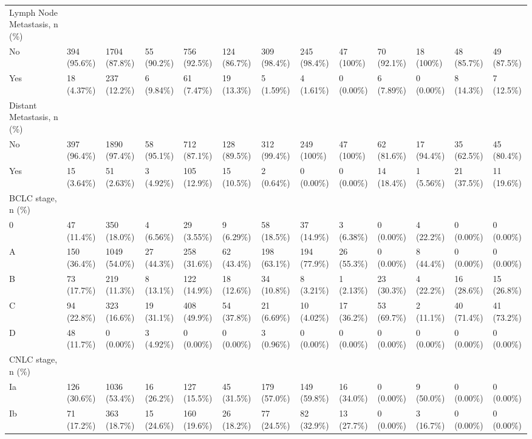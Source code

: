 \begin{landscape}
\begin{center}
\begin{longtable}{p{5.2cm}p{3.0cm}}
Lymph Node Metastasis, n (\%) &  &  &  &  &  &  &  &  &  &  &  &  \\
No & 394 (95.6\%) & 1704 (87.8\%) & 55 (90.2\%) & 756 (92.5\%) & 124 (86.7\%) & 309 (98.4\%) & 245 (98.4\%) & 47 (100\%) & 70 (92.1\%) & 18 (100\%) & 48 (85.7\%) & 49 (87.5\%) \\
Yes & 18 (4.37\%) & 237 (12.2\%) & 6 (9.84\%) & 61 (7.47\%) & 19 (13.3\%) & 5 (1.59\%) & 4 (1.61\%) & 0 (0.00\%) & 6 (7.89\%) & 0 (0.00\%) & 8 (14.3\%) & 7 (12.5\%) \\
Distant Metastasis, n (\%) &  &  &  &  &  &  &  &  &  &  &  &  \\
No & 397 (96.4\%) & 1890 (97.4\%) & 58 (95.1\%) & 712 (87.1\%) & 128 (89.5\%) & 312 (99.4\%) & 249 (100\%) & 47 (100\%) & 62 (81.6\%) & 17 (94.4\%) & 35 (62.5\%) & 45 (80.4\%) \\
Yes & 15 (3.64\%) & 51 (2.63\%) & 3 (4.92\%) & 105 (12.9\%) & 15 (10.5\%) & 2 (0.64\%) & 0 (0.00\%) & 0 (0.00\%) & 14 (18.4\%) & 1 (5.56\%) & 21 (37.5\%) & 11 (19.6\%) \\
BCLC stage, n (\%) &  &  &  &  &  &  &  &  &  &  &  &  \\
0 & 47 (11.4\%) & 350 (18.0\%) & 4 (6.56\%) & 29 (3.55\%) & 9 (6.29\%) & 58 (18.5\%) & 37 (14.9\%) & 3 (6.38\%) & 0 (0.00\%) & 4 (22.2\%) & 0 (0.00\%) & 0 (0.00\%) \\
A & 150 (36.4\%) & 1049 (54.0\%) & 27 (44.3\%) & 258 (31.6\%) & 62 (43.4\%) & 198 (63.1\%) & 194 (77.9\%) & 26 (55.3\%) & 0 (0.00\%) & 8 (44.4\%) & 0 (0.00\%) & 0 (0.00\%) \\
B & 73 (17.7\%) & 219 (11.3\%) & 8 (13.1\%) & 122 (14.9\%) & 18 (12.6\%) & 34 (10.8\%) & 8 (3.21\%) & 1 (2.13\%) & 23 (30.3\%) & 4 (22.2\%) & 16 (28.6\%) & 15 (26.8\%) \\
C & 94 (22.8\%) & 323 (16.6\%) & 19 (31.1\%) & 408 (49.9\%) & 54 (37.8\%) & 21 (6.69\%) & 10 (4.02\%) & 17 (36.2\%) & 53 (69.7\%) & 2 (11.1\%) & 40 (71.4\%) & 41 (73.2\%) \\
D & 48 (11.7\%) & 0 (0.00\%) & 3 (4.92\%) & 0 (0.00\%) & 0 (0.00\%) & 3 (0.96\%) & 0 (0.00\%) & 0 (0.00\%) & 0 (0.00\%) & 0 (0.00\%) & 0 (0.00\%) & 0 (0.00\%) \\
CNLC stage, n (\%) &  &  &  &  &  &  &  &  &  &  &  &  \\
Ia & 126 (30.6\%) & 1036 (53.4\%) & 16 (26.2\%) & 127 (15.5\%) & 45 (31.5\%) & 179 (57.0\%) & 149 (59.8\%) & 16 (34.0\%) & 0 (0.00\%) & 9 (50.0\%) & 0 (0.00\%) & 0 (0.00\%) \\
Ib & 71 (17.2\%) & 363 (18.7\%) & 15 (24.6\%) & 160 (19.6\%) & 26 (18.2\%) & 77 (24.5\%) & 82 (32.9\%) & 13 (27.7\%) & 0 (0.00\%) & 3 (16.7\%) & 0 (0.00\%) & 0 (0.00\%) \\

\end{longtable}
\end{center}
\end{landscape}
